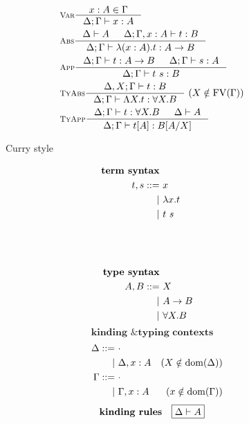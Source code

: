 \begin{figure}
\begin{singlespace}
\begin{minipage}{.46\textwidth}
\vspace*{-1em}
\begin{align*}
& \inference[\sc Var]{x:A \in \Gamma}{\Delta;\Gamma |- x:A} \\
& \inference[\sc Abs]{\Delta |- A & \Delta;\Gamma,x:A |- t : B}
	             {\Delta;\Gamma |- \l(x:A).t : A -> B} \\
& \inference[\sc App]{\Delta;\Gamma |- t : A -> B & \Delta;\Gamma |- s : A}
		     {\Delta;\Gamma |- t~s : B} \\
& \inference[\sc TyAbs]{\Delta,X;\Gamma |- t : B}
		       {\Delta;\Gamma |- \L X.t : \forall X.B} ~
		       (X\notin\FV(\Gamma)) \\
& \inference[\sc TyApp]{\Delta;\Gamma |- t : \forall X.B & \Delta |- A}
		       {\Delta;\Gamma |- t[A] : B[A/X]}
\end{align*}
\end{minipage}
\begin{minipage}{.46\textwidth}
	\begin{center}Curry style\end{center}
\def\baselinestretch{0}
\small
\begin{align*}
\textbf{term syntax} \\
t,s ::= &~ x           \\
      | &~ \l x    . t \\
      | &~ t ~ s       \\
        &~\phantom{| \L X}  \\
        &~\phantom{| t [A]\vspace*{.1em}} \\
\\
\textbf{type syntax} \\
A,B ::= &~ X \\
      | &~ A -> B \\
      | &~ \forall X . B \\
\end{align*}
\[ \textbf{kinding \& typing contexts} \]\vspace*{-1em}
\begin{align*}\quad
\Delta ::= &~ \cdot \\
	 | &~ \Delta, x:A & (X\notin \mathop{\mathrm{dom}}(\Delta)) \\
\Gamma ::= &~ \cdot \\
	 | &~ \Gamma, x:A & (x\notin \mathop{\mathrm{dom}}(\Gamma)) \\
\end{align*}
\[ \textbf{kinding rules} \quad \framebox{$ \Delta |- A $}\]\vspace*{-1em}

\end{minipage}
\end{singlespace}
\end{figure}
